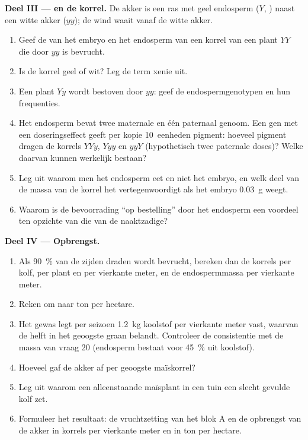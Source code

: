 \begin{problem}
\medskip
\noindent\textbf{Deel III ---  en de korrel.}
De akker is een ras met geel endosperm ($Y$, ) naast een witte
akker ($yy$); de wind waait vanaf de witte akker.
\begin{enumerate}[resume]
  \item Geef de  van het embryo en het endosperm van een korrel van
        een plant $YY$ die door  $yy$ is bevrucht.
  \item Is de korrel geel of wit? Leg de term xenie uit.
  \item Een plant $Yy$ wordt bestoven door  $yy$: geef de
        endospermgenotypen en hun frequenties.
  \item Het endosperm bevat twee maternale en één paternaal genoom.
        Een gen met een doseringseffect geeft per kopie 10~eenheden
        pigment: hoeveel pigment dragen de korrels $YYy$, $Yyy$ en $yyY$
        (hypothetisch twee paternale doses)? Welke daarvan kunnen
        werkelijk bestaan?
  \item Leg uit waarom men het endosperm eet en niet het embryo, en welk
        deel van de massa van de korrel het vertegenwoordigt als het
        embryo \qty{0.03}{g} weegt.
  \item Waarom is de bevoorrading ``op bestelling'' door het endosperm een
        voordeel ten opzichte van die van de naaktzadige?
\end{enumerate}

\medskip
\noindent\textbf{Deel IV --- Opbrengst.}
\begin{enumerate}[resume]
  \item Als \qty{90}{\%} van de zijden draden wordt bevrucht, bereken dan de
        korrels per kolf, per plant en per vierkante meter, en de
        endospermmassa per vierkante meter.
  \item Reken om naar ton per hectare.
  \item Het gewas legt per seizoen \qty{1.2}{kg} koolstof per vierkante meter
        vast, waarvan de helft in het geoogste graan belandt. Controleer
        de consistentie met de massa van vraag 20 (endosperm bestaat voor
        \qty{45}{\%} uit koolstof).
  \item Hoeveel  gaf de akker af per geoogste maïskorrel?
  \item Leg uit waarom een alleenstaande maïsplant in een tuin een slecht
        gevulde kolf zet.
  \item Formuleer het resultaat: de vruchtzetting van het blok A en de
        opbrengst van de akker in korrels per vierkante meter en in ton
        per hectare.
\end{enumerate}
\end{problem}
